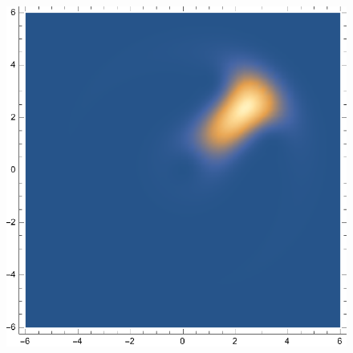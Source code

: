 \documentclass{article}
\theoremstyle{definition}
\begin{document}
\begin{enumerate}[label=\alph*)]
\begin{figure}[!htb]
\begin{minipage}{.24\textwidth}
	\end{minipage}
	\begin{minipage}{.24\textwidth}
  	\centering
  	\includegraphics[width=.7\linewidth]{figures/3-N-20.eps}
	\end{minipage} 
	\end{figure}
	

\end{enumerate}
\end{document}

